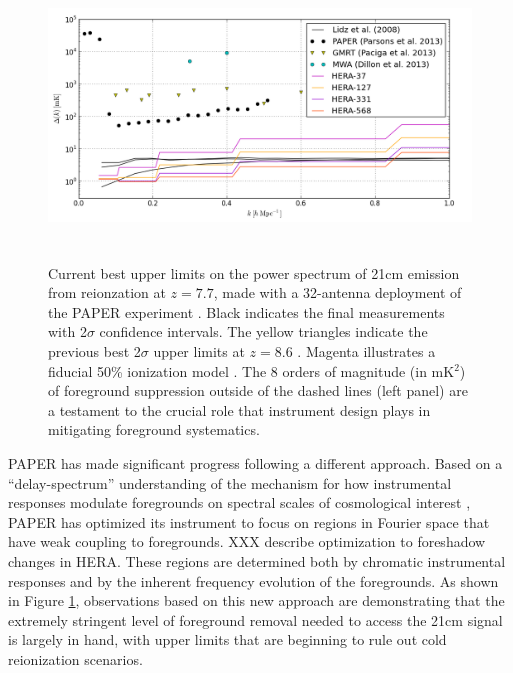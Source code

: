 \documentclass[preprint]{aastex}
\begin{document}
\begin{figure}[!ht]\centering
\includegraphics[height=3.0in]{plots/eor_pspec.png}
\caption{\small
Current best upper limits on the power spectrum of 21cm emission from
reionzation at $z=7.7$, made with a 32-antenna deployment of the PAPER
experiment \citep{parsons_et_al2013}. Black indicates the final measurements
with 2$\sigma$ confidence intervals. The yellow triangles indicate the previous
best 2$\sigma$ upper limits at $z=8.6$ \citep{paciga_et_al2013}. Magenta
illustrates a fiducial 50\% ionization model \citep{lidz_et_al2008}. The 8
orders of magnitude (in mK$^2$) of foreground suppression outside of the dashed
lines (left panel) are a testament to the crucial role that instrument design
plays in mitigating foreground systematics.
}\label{fig:eor_pspec}
\end{figure}

PAPER has made significant progress following a different approach.  Based on a
``delay-spectrum'' understanding of the mechanism for how instrumental
responses modulate foregrounds on spectral scales of cosmological interest
\citep{parsons_et_al2012b}, PAPER has optimized its instrument to focus on
regions in Fourier space that have weak coupling to foregrounds. XXX describe
optimization to foreshadow changes in HERA.  These regions are determined both
by chromatic instrumental responses and by the inherent frequency evolution of
the foregrounds.  As shown in Figure \ref{fig:eor_pspec}, observations based on
this new approach are demonstrating that the extremely stringent level of
foreground removal needed to access the 21cm signal is largely in hand, with
upper limits that are beginning to rule out cold reionization scenarios. 



\vspace{-0.25in}
\end{document}

